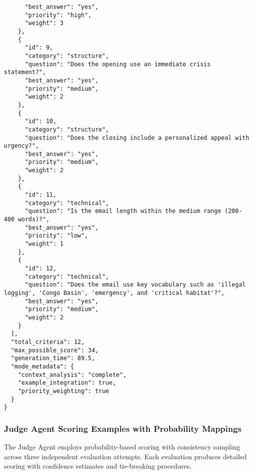 \begin{verbatim}
      "best_answer": "yes",
      "priority": "high",
      "weight": 3
    },
    {
      "id": 9,
      "category": "structure",
      "question": "Does the opening use an immediate crisis statement?",
      "best_answer": "yes",
      "priority": "medium",
      "weight": 2
    },
    {
      "id": 10,
      "category": "structure",
      "question": "Does the closing include a personalized appeal with urgency?",
      "best_answer": "yes",
      "priority": "medium",
      "weight": 2
    },
    {
      "id": 11,
      "category": "technical",
      "question": "Is the email length within the medium range (200-400 words)?",
      "best_answer": "yes",
      "priority": "low",
      "weight": 1
    },
    {
      "id": 12,
      "category": "technical",
      "question": "Does the email use key vocabulary such as 'illegal logging', 'Congo Basin', 'emergency', and 'critical habitat'?",
      "best_answer": "yes",
      "priority": "medium",
      "weight": 2
    }
  ],
  "total_criteria": 12,
  "max_possible_score": 34,
  "generation_time": 89.5,
  "mode_metadata": {
    "context_analysis": "complete",
    "example_integration": true,
    "priority_weighting": true
  }
}
\end{verbatim}

\subsubsection{Judge Agent Scoring Examples with Probability Mappings}

The Judge Agent employs probability-based scoring with consistency sampling across three independent evaluation attempts. Each evaluation produces detailed scoring with confidence estimates and tie-breaking procedures.

